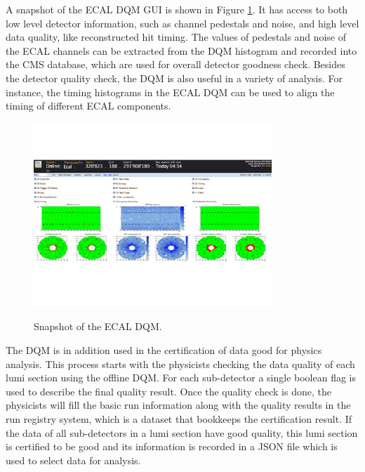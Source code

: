 \documentclass[thesis.tex]{subfiles}
\begin{document}
A snapshot of the ECAL DQM GUI is shown in Figure \ref{fig:ecaldqm}.
It has access to both low level detector information, such as channel pedestals and noise, and high level data quality, like reconstructed hit timing. 
The values of pedestals and noise of the ECAL channels can be extracted from the DQM histogram and recorded into the CMS database, which are used for overall detector goodness check.
Besides the detector quality check, the DQM is also useful in a variety of analysis. 
For instance, the timing histograms in the ECAL DQM can be used to align the timing of different ECAL components. 

\begin{figure}[hbt]
	\centering
	\includegraphics[width=0.8\textwidth]{Fig/ecaldqm.pdf}
	\label{fig:ecaldqm}
	\caption{Snapshot of the ECAL DQM.}
\end{figure}

The DQM is in addition used in the certification of data good for physics analysis.
This process starts with the physicists checking the data quality of each lumi section using the offline DQM.
For each sub-detector a single boolean flag is used to describe the final quality result.
Once the quality check is done, the physicists will fill the basic run information along with the quality results in the run registry system, which is a dataset that bookkeeps the certification result.
If the data of all sub-detectors in a lumi section have good quality, this lumi section is certified to be good and its information is recorded in a JSON file which is used to select data for analysis. 
\end{document}
